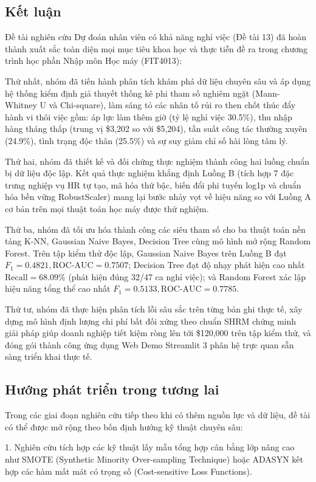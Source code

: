 \documentclass[12pt,a4paper]{article}
\begin{document}
\subsection{Kết luận}
Đề tài nghiên cứu Dự đoán nhân viên có khả năng nghỉ việc (Đề tài 13) đã hoàn thành xuất sắc toàn diện mọi mục tiêu khoa học và thực tiễn đề ra trong chương trình học phần Nhập môn Học máy (FIT4013):

Thứ nhất, nhóm đã tiến hành phân tích khám phá dữ liệu chuyên sâu và áp dụng hệ thống kiểm định giả thuyết thống kê phi tham số nghiêm ngặt (Mann-Whitney U và Chi-square), làm sáng tỏ các nhân tố rủi ro then chốt thúc đẩy hành vi thôi việc gồm: áp lực làm thêm giờ (tỷ lệ nghỉ việc 30.5\%), thu nhập hàng tháng thấp (trung vị \$3,202 so với \$5,204), tần suất công tác thường xuyên (24.9\%), tình trạng độc thân (25.5\%) và sự suy giảm chỉ số hài lòng tâm lý.

Thứ hai, nhóm đã thiết kế và đối chứng thực nghiệm thành công hai luồng chuẩn bị dữ liệu độc lập. Kết quả thực nghiệm khẳng định Luồng B (tích hợp 7 đặc trưng nghiệp vụ HR tự tạo, mã hóa thứ bậc, biến đổi phi tuyến log1p và chuẩn hóa bền vững RobustScaler) mang lại bước nhảy vọt về hiệu năng so với Luồng A cơ bản trên mọi thuật toán học máy được thử nghiệm.

Thứ ba, nhóm đã tối ưu hóa thành công các siêu tham số cho ba thuật toán nền tảng K-NN, Gaussian Naive Bayes, Decision Tree cùng mô hình mở rộng Random Forest. Trên tập kiểm thử độc lập, Gaussian Naive Bayes trên Luồng B đạt $F_1 = 0.4821, \text{ROC-AUC} = 0.7507$; Decision Tree đạt độ nhạy phát hiện cao nhất $\text{Recall} = 68.09\%$ (phát hiện đúng 32/47 ca nghỉ việc); và Random Forest xác lập hiệu năng tổng thể cao nhất $F_1 = 0.5133, \text{ROC-AUC} = 0.7785$.

Thứ tư, nhóm đã thực hiện phân tích lỗi sâu sắc trên từng bản ghi thực tế, xây dựng mô hình định lượng chi phí bất đối xứng theo chuẩn SHRM chứng minh giải pháp giúp doanh nghiệp tiết kiệm ròng lên tới \$120,000 trên tập kiểm thử, và đóng gói thành công ứng dụng Web Demo Streamlit 3 phân hệ trực quan sẵn sàng triển khai thực tế.

\subsection{Hướng phát triển trong tương lai}
Trong các giai đoạn nghiên cứu tiếp theo khi có thêm nguồn lực và dữ liệu, đề tài có thể được mở rộng theo bốn định hướng kỹ thuật chuyên sâu:

1. Nghiên cứu tích hợp các kỹ thuật lấy mẫu tổng hợp cân bằng lớp nâng cao như SMOTE (Synthetic Minority Over-sampling Technique) hoặc ADASYN kết hợp các hàm mất mát có trọng số (Cost-sensitive Loss Functions).
\end{document}
